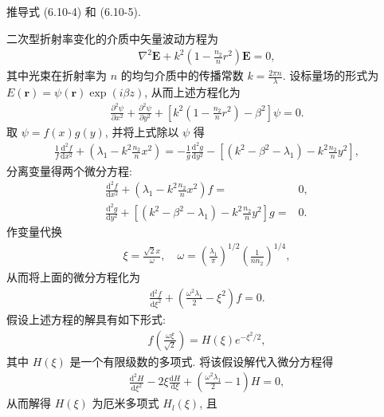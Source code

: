 \documentclass{note}
\begin{document}
\begin{exe}
    推导式 (6.10-4) 和 (6.10-5).
\end{exe}
\begin{pf}
    二次型折射率变化的介质中矢量波动方程为
    \begin{align}
        \nabla^2\bm{E}+k^2\left(1-\frac{n_2}{n}r^2\right)\bm{E}=0,
    \end{align}
    其中光束在折射率为 $n$ 的均匀介质中的传播常数 $k=\frac{2\pi n}{\lambda}$.
    设标量场的形式为 $E(\bm{r})=\psi(\bm{r})\exp(i\beta z)$, 从而上述方程化为
    \begin{align}
        \frac{\partial^2\psi}{\partial x^2}+\frac{\partial^2\psi}{\partial y^2}+\left[k^2\left(1-\frac{n_2}{n}r^2\right)-\beta^2\right]\psi=0.
    \end{align}
    取 $\psi=f(x)g(y)$, 并将上式除以 $\psi$ 得
    \begin{align}
        \frac{1}{f}\frac{\mathrm{d}^2f}{\mathrm{d}x^2}+\left(\lambda_1-k^2\frac{n_2}{n}x^2\right)=-\frac{1}{g}\frac{\mathrm{d}^2g}{\mathrm{d}y^2}-\left[(k^2-\beta^2-\lambda_1)-k^2\frac{n_2}{n}y^2\right],
    \end{align}
    分离变量得两个微分方程:
    \begin{align}
        \frac{\mathrm{d}^2f}{\mathrm{d}x^2}+\left(\lambda_1-k^2\frac{n_2}{n}x^2\right)f=&0,\\
        \frac{\mathrm{d}^2g}{\mathrm{d}y^2}+\left[(k^2-\beta^2-\lambda_1)-k^2\frac{n_2}{n}y^2\right]g=&0.
    \end{align}
    作变量代换
    \begin{align}
        \xi=\frac{\sqrt{2}x}{\omega},\quad\omega=\left(\frac{\lambda_1}{\pi}\right)^{1/2}\left(\frac{1}{nn_2}\right)^{1/4},
    \end{align}
    从而将上面的微分方程化为
    \begin{align}
        \frac{\mathrm{d}^2f}{\mathrm{d}\xi^2}+\left(\frac{\omega^2\lambda_1}{2}-\xi^2\right)f=0.
    \end{align}
    假设上述方程的解具有如下形式:
    \begin{align}
        f\left(\frac{\omega\xi}{\sqrt{2}}\right)=H(\xi)e^{-\xi^2/2},
    \end{align}
    其中 $H(\xi)$ 是一个有限级数的多项式.
    将该假设解代入微分方程得
    \begin{align}
        \frac{\mathrm{d}^2H}{\mathrm{d}\xi^2}-2\xi\frac{\mathrm{d}H}{\mathrm{d}\xi}+\left(\frac{\omega^2\lambda_1}{2}-1\right)H=0,
    \end{align}
    从而解得 $H(\xi)$ 为厄米多项式 $H_l(\xi)$, 且

\end{pf}
\end{document}
